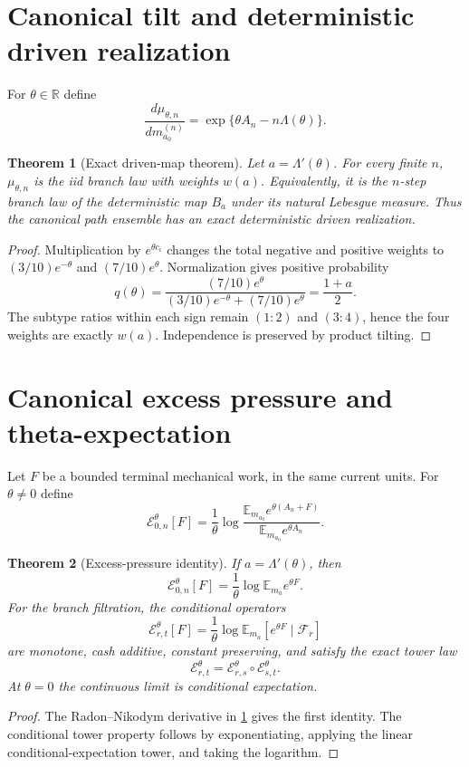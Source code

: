 \documentclass[11pt,reqno]{amsart}
\newtheorem{theorem}{Theorem}[section]
\theoremstyle{remark}
\newcommand{\E}{\mathbb E}
\newcommand{\R}{\mathbb R}
\newcommand{\cE}{\mathcal E}
\begin{document}
\section{Canonical tilt and deterministic driven realization}
For $\theta\in\R$ define
\[
 \frac{d\mu_{\theta,n}}{dm_{a_0}^{(n)}}
 =\exp\{\theta A_n-n\Lambda(\theta)\}.
\]

\begin{theorem}[Exact driven-map theorem]\label{thm:driven}
Let $a=\Lambda'(\theta)$.  For every finite $n$, $\mu_{\theta,n}$ is the iid
branch law with weights $w(a)$.  Equivalently, it is the $n$-step branch law of
the deterministic map $B_a$ under its natural Lebesgue measure.  Thus the
canonical path ensemble has an exact deterministic driven realization.
\end{theorem}
\begin{proof}
Multiplication by $e^{\theta c_i}$ changes the total negative and positive
weights to $(3/10)e^{-\theta}$ and $(7/10)e^\theta$.  Normalization gives
positive probability
\[
 q(\theta)=\frac{(7/10)e^\theta}
 {(3/10)e^{-\theta}+(7/10)e^\theta}
 =\frac{1+a}{2}.
\]
The subtype ratios within each sign remain $(1:2)$ and $(3:4)$, hence the four
weights are exactly $w(a)$.  Independence is preserved by product tilting.
\end{proof}

\section{Canonical excess pressure and theta-expectation}
Let $F$ be a bounded terminal mechanical work, in the same current units.
For $\theta\ne0$ define
\[
 \cE_{0,n}^{\theta}[F]
 =\frac1\theta\log
 \frac{
 \E_{m_{a_0}}e^{\theta(A_n+F)}
 }{
 \E_{m_{a_0}}e^{\theta A_n}
 }.
\]

\begin{theorem}[Excess-pressure identity]\label{thm:excess}
If $a=\Lambda'(\theta)$, then
\[
 \cE_{0,n}^{\theta}[F]
 =\frac1\theta\log\E_{m_a}e^{\theta F}.
\]
For the branch filtration, the conditional operators
\[
 \cE_{r,t}^{\theta}[F]
 =\frac1\theta\log
 \E_{m_a}\left[e^{\theta F}\mid\mathcal F_r\right]
\]
are monotone, cash additive, constant preserving, and satisfy the exact tower
law
\[
 \cE_{r,t}^{\theta}
 =\cE_{r,s}^{\theta}\circ\cE_{s,t}^{\theta}.
\]
At $\theta=0$ the continuous limit is conditional expectation.
\end{theorem}
\begin{proof}
The Radon--Nikodym derivative in \cref{thm:driven} gives the first identity.
The conditional tower property follows by exponentiating, applying the linear
conditional-expectation tower, and taking the logarithm.
\end{proof}
\end{document}

